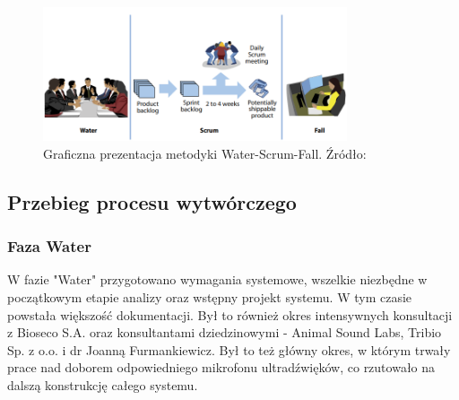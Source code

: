 \documentclass{sprz}
\begin{document}
\begin{figure}[h]
  \centering
  \includegraphics[width=0.8\textwidth]{sprz/water-scrum-fall.png}
  \caption{Graficzna prezentacja metodyki Water-Scrum-Fall. Źródło: \cite{water-scrum-fall1}}
  \label{img:water-scrum-fall}
\end{figure}

\subsection{Przebieg procesu wytwórczego}

\subsubsection{Faza Water}
W fazie "Water" przygotowano wymagania systemowe, wszelkie niezbędne w początkowym etapie analizy oraz wstępny projekt systemu. W tym czasie powstała większość dokumentacji. Był to również okres intensywnych konsultacji z Bioseco S.A. oraz konsultantami dziedzinowymi - Animal Sound Labs, Tribio Sp. z o.o. i dr Joanną Furmankiewicz. Był to też główny okres, w którym trwały prace nad doborem odpowiedniego mikrofonu ultradźwięków, co rzutowało na dalszą konstrukcję całego systemu.
\end{document}
